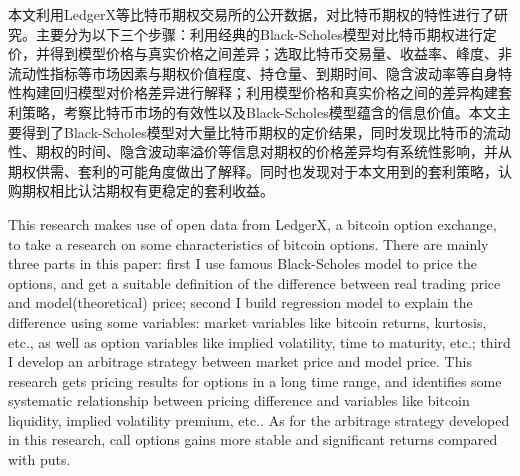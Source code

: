 \begin{cabstract}
    本文利用LedgerX等比特币期权交易所的公开数据，对比特币期权的特性进行了研究。主要分为以下三个步骤：利用经典的Black-Scholes模型对比特币期权进行定价，并得到模型价格与真实价格之间差异；选取比特币交易量、收益率、峰度、非流动性指标等市场因素与期权价值程度、持仓量、到期时间、隐含波动率等自身特性构建回归模型对价格差异进行解释；利用模型价格和真实价格之间的差异构建套利策略，考察比特币市场的有效性以及Black-Scholes模型蕴含的信息价值。本文主要得到了Black-Scholes模型对大量比特币期权的定价结果，同时发现比特币的流动性、期权的时间、隐含波动率溢价等信息对期权的价格差异均有系统性影响，并从期权供需、套利的可能角度做出了解释。同时也发现对于本文用到的套利策略，认购期权相比认沽期权有更稳定的套利收益。
\end{cabstract}
\begin{eabstract}
    This research makes use of open data from LedgerX, a bitcoin option exchange, to take a research on some characteristics of bitcoin options. There are mainly three parts in this paper: first I use famous Black-Scholes model to price the options, and get a suitable definition of the difference between real trading price and model(theoretical) price; second I build regression model to explain the difference using some variables: market variables like bitcoin returns, kurtosis, etc., as well as option variables like implied volatility, time to maturity, etc.; third I develop an arbitrage strategy between market price and model price. This research gets pricing results for options in a long time range, and identifies some systematic relationship between pricing difference and variables like bitcoin liquidity, implied volatility premium, etc.. As for the arbitrage strategy developed in this research, call options gains more stable and significant returns compared with puts.
\end{eabstract}
